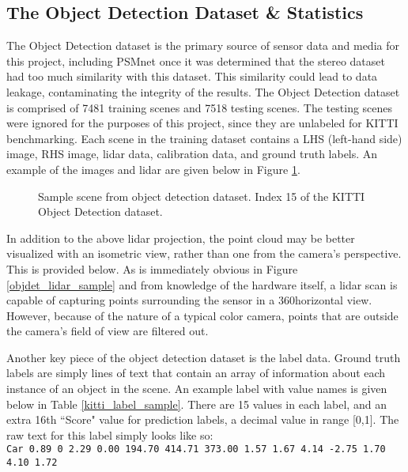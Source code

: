\subsection{The Object Detection Dataset \& Statistics}
The Object Detection dataset is the primary source of sensor data and media for this project, including PSMnet once it was determined that the stereo dataset had too much similarity with this dataset. This similarity could lead to data leakage, contaminating the integrity of the results. The Object Detection dataset is comprised of 7481 training scenes and 7518 testing scenes. The testing scenes were ignored for the purposes of this project, since they are unlabeled for KITTI benchmarking. Each scene in the training dataset contains a LHS (left-hand side) image, RHS image, lidar data, calibration data, and ground truth labels. An example of the images and lidar are given below in Figure \ref{objdet_sample}.

\begin{figure}[H]
    \centering
    \caption{Sample scene from object detection dataset. Index 15 of the KITTI Object Detection dataset.}
    \label{objdet_sample}
\end{figure}

In addition to the above lidar projection, the point cloud may be better visualized with an isometric view, rather than one from the camera's perspective. This is provided below. As is immediately obvious in Figure \ref{objdet_lidar_sample} and from knowledge of the hardware itself, a lidar scan is capable of capturing points surrounding the sensor in a 360\deg horizontal view. However, because of the nature of a typical color camera, points that are outside the camera's field of view are filtered out.

Another key piece of the object detection dataset is the label data. Ground truth labels are simply lines of text that contain an array of information about each instance of an object in the scene. An example label with value names is given below in Table \ref{kitti_label_sample}. There are 15 values in each label, and an extra 16th ``Score" value for prediction labels, a decimal value in range [0,1]. The raw text for this label simply looks like so: \\
\texttt{Car 0.89 0 2.29 0.00 194.70 414.71 373.00 1.57 1.67 4.14 -2.75 1.70 4.10 1.72} \\


